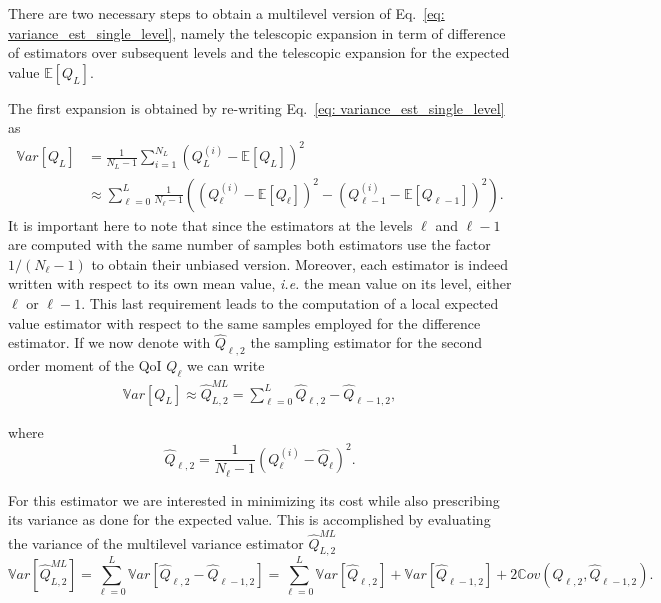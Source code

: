 There are two necessary steps to obtain a multilevel version of Eq.~\eqref{eq: variance_est_single_level}, namely the telescopic expansion in term of difference of estimators
over subsequent levels and the telescopic expansion for the expected value $\mathbb{E}\left[Q_L\right]$.

The first expansion is obtained by re-writing Eq.~\eqref{eq: variance_est_single_level} as 
\begin{equation}
\begin{split}
\label{eq: variance_est_ML}
 \mathbb{V}ar\left[Q_L\right] &=       \frac{1}{N_L - 1} \sum_{i=1}^{N_L} \left( Q_L^{(i)} - \mathbb{E}\left[Q_L\right] \right)^2 \\
                              &\approx \sum_{\ell=0}^L  \frac{1}{N_\ell - 1} \left( \left( Q_\ell^{(i)} - \mathbb{E}\left[Q_\ell\right] \right)^2 
                                                                                  - \left( Q_{\ell-1}^{(i)} - \mathbb{E}\left[Q_{\ell-1}\right] \right)^2 \right).
\end{split}
\end{equation}
It is important here to note that since the estimators at the levels $\ell$ and $\ell-1$ are computed with the same number of samples both estimators use the factor 
$1/(N_\ell-1)$ to obtain their unbiased version. Moreover, each estimator is indeed written with respect to its own mean value, \textit{i.e.} the mean value on its level,
either $\ell$ or $\ell-1$. This last requirement leads to the computation of a local expected value estimator with respect to the same samples employed for the difference estimator. If we now denote with $\hat{Q}_{\ell,2}$ the sampling estimator for the second order moment of the QoI $Q_\ell$ we can write
\begin{equation}
\begin{split}
\label{eq: variance_est_ML_approximation}
 \mathbb{V}ar\left[Q_L\right] \approx \hat{Q}_{L,2}^{ML} = \sum_{\ell=0}^L \hat{Q}_{\ell,2} - \hat{Q}_{\ell-1,2},
\end{split}
\end{equation}

where 
\begin{equation}
 \hat{Q}_{\ell,2} = \frac{1}{N_\ell - 1} \left( Q_\ell^{(i)} - \hat{Q}_\ell \right)^2.
\end{equation}

For this estimator we are interested in minimizing its cost while also prescribing its variance as done for the expected value. This is accomplished by evaluating the 
variance of the multilevel variance estimator $\hat{Q}_{L,2}^{ML}$
\begin{equation}
 \mathbb{V}ar\left[ \hat{Q}_{L,2}^{ML} \right] = \sum_{\ell=0}^L \mathbb{V}ar\left[ \hat{Q}_{\ell,2} - \hat{Q}_{\ell-1,2} \right]
                                               = \sum_{\ell=0}^L \mathbb{V}ar\left[ \hat{Q}_{\ell,2} \right] + \mathbb{V}ar\left[\hat{Q}_{\ell-1,2} \right]
                                               + 2 \mathbb{C}ov\left( \hat{Q}_{\ell,2},\hat{Q}_{\ell-1,2} \right).
\end{equation}

